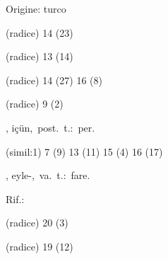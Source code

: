 \begin{glossario}{Origine: turco}
\begin{subvocedue}
\item[(radice)]   14 (23)
\item[(radice)]   13 (14)
\item[(radice)]   14 (27) 16 (8)
\item[(radice)]   9 (2)
\end{subvocedue}
\item[{\color{colorlowref}\spzrl{.J^c:Un}},] {\sf içün},\ post.\ t.:\ per.
\begin{subvocedue}
\item[(simil:1)]   7 (9) 13 (11) 15 (4) 16 (17)
\end{subvocedue}
\item[{\color{colorlowref}\spzrl{^EyleB}},] {\sf eyle-},\ va.\ t.:\ fare.
\begin{subvocedue}
\item[Rif.:] 
\end{subvocedue}
\begin{subvocedue}
\item[(radice)]   20 (3)
\item[(radice)]   19 (12)
\end{subvocedue}



\end{glossario}
